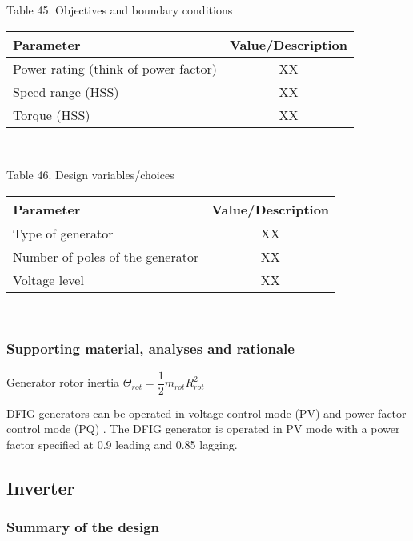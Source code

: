 \begin{center}
Table 45. Objectives and boundary conditions\\
\begin{tabular}{ |l|c| } 
\hline
\textbf{Parameter} & \textbf{Value/Description}  \\ 
\hline
Power rating (think of power factor) & XX \\
\hline
Speed range (HSS) & XX \\
\hline
Torque (HSS) & XX \\
\hline
\end{tabular} \\
\end{center}

\begin{center}
Table 46. Design variables/choices\\
\begin{tabular}{ |l|c| } 
\hline
\textbf{Parameter} & \textbf{Value/Description}  \\ 
\hline
Type of generator & XX  \\ 
\hline
Number of poles of the generator & XX \\
\hline
Voltage level & XX \\
\hline
\end{tabular} \\
\end{center}



\subsubsection{Supporting material, analyses and rationale}

Generator rotor inertia
$\Theta_{rot}= \dfrac{1}{2}m_{rot}R_{rot}^2$

DFIG generators can be operated in voltage control mode (PV) and power factor control mode (PQ) \cite{Londero2012}. The DFIG generator is operated in PV mode with a power factor specified at 0.9 leading and 0.85 lagging.

\newpage
\subsection{Inverter}

\subsubsection{Summary of the design}

